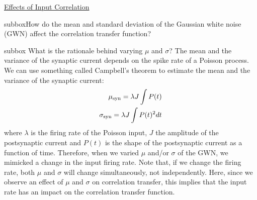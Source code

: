 \begin{textbox}{\href{https://compneuro.neuromatch.io/tutorials/W1D4_GeneralizedLinearModels/student/W1D4_Tutorial1.html}{Effects of Input Correlation } }
\begin{subbox}{subbox}{How do the mean and standard deviation of the Gaussian white noise (GWN) affect the correlation transfer function?}
\end{subbox}
\begin{subbox}{subbox}{
What is the rationale behind varying $\mu$ and $\sigma$?}
\scriptsize
The mean and the variance of the synaptic current depends on the spike rate of a Poisson process. We can use something called Campbell's theorem to estimate the mean and the variance of the synaptic current:
\begin{align}
\mu_{\rm syn} = \lambda J \int P(t) \\
\sigma_{\rm syn} = \lambda J \int P(t)^2 dt
\end{align}
where $\lambda$ is the firing rate of the Poisson input, $J$ the amplitude of the postsynaptic current and $P(t)$ is the shape of the postsynaptic current as a function of time. 
Therefore, when we varied $\mu$ and/or $\sigma$ of the GWN, we mimicked a change in the input firing rate. Note that, if we change the firing rate, both $\mu$ and $\sigma$ will change simultaneously, not independently. 
Here, since we observe an effect of $\mu$ and $\sigma$ on correlation transfer, this implies that the input rate has an impact on the correlation transfer function.

\end{subbox}
\end{textbox}

